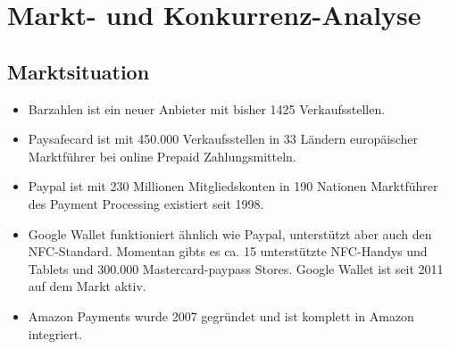 \section{Markt- und Konkurrenz-Analyse}

\subsection{Marktsituation}
\begin{itemize}
\item Barzahlen ist ein neuer Anbieter mit bisher 1425 Verkaufsstellen.
\item Paysafecard ist mit 450.000 Verkaufsstellen in 33 Ländern europäischer Marktführer bei online Prepaid Zahlungsmitteln.
\item Paypal ist mit 230 Millionen Mitgliedskonten in 190 Nationen Marktführer des Payment Processing existiert seit 1998.
\item Google Wallet funktioniert ähnlich wie Paypal, unterstützt aber auch den NFC-Standard. Momentan gibts es ca. 15 unterstützte NFC-Handys und Tablets und 300.000 Mastercard-paypass Stores. Google Wallet ist seit 2011 auf dem Markt aktiv.
\item Amazon Payments wurde 2007 gegründet und ist komplett in Amazon integriert.
\end{itemize}

